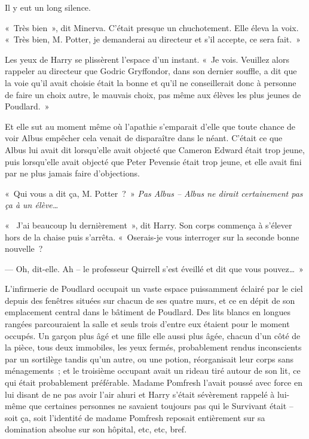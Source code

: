 Il y eut un long silence.

«~Très bien~», dit Minerva.
C'était presque un chuchotement.
Elle éleva la voix.
«~Très bien, M. Potter, je demanderai au directeur et s'il accepte, ce sera fait.~»

Les yeux de Harry se plissèrent l'espace d'un instant.
«~Je vois.
Veuillez alors rappeler au directeur que Godric Gryffondor, dans son dernier souffle, a dit que la voie qu'il avait choisie était la bonne et qu'il ne conseillerait donc à personne de faire un choix autre, le mauvais choix, pas même aux élèves les plus jeunes de Poudlard.~»

Et elle sut au moment même où l'apathie s'emparait d'elle que toute chance de voir Albus empêcher cela venait de disparaître dans le néant.
C'était ce que Albus lui avait dit lorsqu'elle avait objecté que Cameron Edward était trop jeune, puis lorsqu'elle avait objecté que Peter Pevensie était trop jeune, et elle avait fini par ne plus jamais faire d'objections.

«~Qui vous a dit ça, M. Potter~?~»
\emph{Pas Albus -- Albus ne dirait certainement pas ça à un élève…}

«~ J'ai beaucoup lu dernièrement~», dit Harry.
Son corps commença à s'élever hors de la chaise puis s'arrêta.
«~Oserais-je vous interroger sur la seconde bonne nouvelle~?

--- Oh, dit-elle.
Ah -- le professeur Quirrell s'est éveillé et dit que vous pouvez…~»

\later

L'infirmerie de Poudlard occupait un vaste espace puissamment éclairé par le ciel depuis des fenêtres situées sur chacun de ses quatre murs, et ce en dépit de son emplacement central dans le bâtiment de Poudlard.
Des lits blancs en longues rangées parcouraient la salle et seuls trois d'entre eux étaient pour le moment occupés.
Un garçon plus âgé et une fille elle aussi plus âgée, chacun d'un côté de la pièce, tous deux immobiles, les yeux fermés, probablement rendus inconscients par un sortilège tandis qu'un autre, ou une potion, réorganisait leur corps sans ménagements~; et le troisième occupant avait un rideau tiré autour de son lit, ce qui était probablement préférable.
Madame Pomfresh l'avait poussé avec force en lui disant de ne pas avoir l'air ahuri et Harry s'était sévèrement rappelé à lui-même que certaines personnes ne savaient toujours pas qui le Survivant était -- soit ça, soit l'identité de madame Pomfresh reposait entièrement sur sa domination absolue sur son hôpital, etc, etc, bref.

